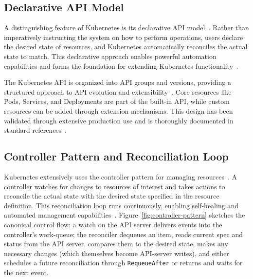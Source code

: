 \subsection{Declarative API Model}

A distinguishing feature of Kubernetes is its declarative API model~\cite{kubernetes_declarative_automation}. Rather than imperatively instructing the system on how to perform operations, users declare the desired state of resources, and Kubernetes automatically reconciles the actual state to match. This declarative approach enables powerful automation capabilities and forms the foundation for extending Kubernetes functionality~\cite{hausenblas2019}.

The Kubernetes API is organized into API groups and versions, providing a structured approach to API evolution and extensibility~\cite{k8s_api}. Core resources like Pods, Services, and Deployments are part of the built-in API, while custom resources can be added through extension mechanisms. This design has been validated through extensive production use and is thoroughly documented in standard references~\cite{luksa2017, hightower2017}.

\subsection{Controller Pattern and Reconciliation Loop}

Kubernetes extensively uses the controller pattern for managing resources~\cite{controller_pattern, ibryam2020}. A controller watches for changes to resources of interest and takes actions to reconcile the actual state with the desired state specified in the resource definition. This reconciliation loop runs continuously, enabling self-healing and automated management capabilities~\cite{dobies2020}. Figure~\ref{fig:controller-pattern} sketches the canonical control flow: a watch on the API server delivers events into the controller's work-queue; the reconciler dequeues an item, reads current spec and status from the API server, compares them to the desired state, makes any necessary changes (which themselves become API-server writes), and either schedules a future reconciliation through \texttt{RequeueAfter} or returns and waits for the next event.

